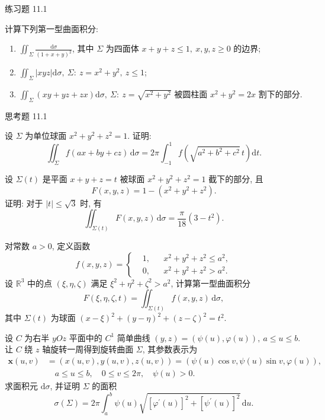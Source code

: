 \begin{exblock}{练习题 11.1}
\item 计算下列第一型曲面积分:
\begin{enumerate}[label=(\arabic*),leftmargin=2.6em,itemsep=0.15\baselineskip,topsep=0.2\baselineskip]
  \item $\iint_{\Sigma} \frac{\mathrm{d} \sigma}{(1+x+y)^{2}}$, 其中 $\Sigma$ 为四面体 $x+y+z \leqslant 1,\ x, y, z \geqslant 0$ 的边界;
  \item $\iint_{\Sigma}|x y z| \mathrm{d} \sigma,\ \Sigma:\ z=x^{2}+y^{2},\ z \leqslant 1$;
  \item $\iint_{\Sigma}(x y+y z+z x) \mathrm{d} \sigma,\ \Sigma:\ z=\sqrt{x^{2}+y^{2}}$ 被圆柱面 $x^{2}+y^{2}=2 x$ 割下的部分.
\end{enumerate}
\end{exblock}

\begin{exblock}{思考题 11.1}
\item 设 $\Sigma$ 为单位球面 $x^{2}+y^{2}+z^{2}=1$. 证明:
\[
  \iint_{\Sigma} f(a x+b y+c z)\,\mathrm{d} \sigma=2 \pi \int_{-1}^{1} f\left(\sqrt{a^{2}+b^{2}+c^{2}}\, t\right) \mathrm{d} t.
\]

\item 设 $\Sigma(t)$ 是平面 $x+y+z=t$ 被球面 $x^{2}+y^{2}+z^{2}=1$ 截下的部分, 且
\[
  F(x, y, z)=1-\left(x^{2}+y^{2}+z^{2}\right).
\]
证明: 对于 $|t| \leqslant \sqrt{3}$ 时, 有
\[
  \iint_{\Sigma(t)} F(x, y, z)\,\mathrm{d} \sigma=\frac{\pi}{18}\left(3-t^{2}\right).
\]

\item 对常数 $a>0$, 定义函数
\[
  f(x, y, z)=\left\{\begin{aligned}
    &1, & & x^{2}+y^{2}+z^{2} \leqslant a^{2}, \\
    &0, & & x^{2}+y^{2}+z^{2}>a^{2}.
  \end{aligned}\right.
\]
设 $\mathbb{R}^{3}$ 中的点 $(\xi, \eta, \zeta)$ 满足 $\xi^{2}+\eta^{2}+\zeta^{2}>a^{2}$, 计算第一型曲面积分
\[
  F(\xi, \eta, \zeta, t)=\iint_{\Sigma(t)} f(x, y, z)\,\mathrm{d} \sigma,
\]
其中 $\Sigma(t)$ 为球面 $(x-\xi)^{2}+(y-\eta)^{2}+(z-\zeta)^{2}=t^{2}$.

\item 设 $C$ 为右半 $y O z$ 平面中的 $C^{1}$ 简单曲线 $(y, z)=(\psi(u), \varphi(u)),\ a \leqslant u \leqslant b$. 让 $C$ 绕 $z$ 轴旋转一周得到旋转曲面 $\Sigma$, 其参数表示为
\begin{align*}
  \boldsymbol{x}(u, v) &=(x(u, v), y(u, v), z(u, v))=(\psi(u) \cos v, \psi(u) \sin v, \varphi(u)), \\
  & \quad a \leqslant u \leqslant b, \quad 0 \leqslant v \leqslant 2 \pi, \quad \psi(u)>0.
\end{align*}
求面积元 $\mathrm{d} \sigma$, 并证明 $\Sigma$ 的面积
\[
  \sigma(\Sigma)=2 \pi \int_{a}^{b} \psi(u) \sqrt{\left[\varphi^{\prime}(u)\right]^{2}+\left[\psi^{\prime}(u)\right]^{2}}\,\mathrm{d} u.
\]
\end{exblock}
